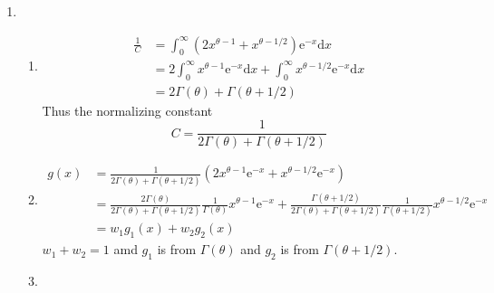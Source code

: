 \documentclass{article}
\begin{document}
\begin{enumerate}[leftmargin = 0 em, label = \arabic*., font = \bfseries]
	

	\item 
	\begin{enumerate}
		\item 
		\begin{align*}
		\frac{1}{C} &= \int_{0}^{\infty} (2 x ^{\theta - 1} + x^{\theta - 1/2}) \mathrm{e}^{-x} \mathrm{d}x\\
		& = 2 \int_{0}^{\infty} x^{\theta - 1} \mathrm{e}^{-x} \mathrm{d}x + \int_{0}^{\infty} x^{\theta - 1/2} \mathrm{e}^{-x} \mathrm{d}x\\
		& = 2 \Gamma(\theta) + \Gamma(\theta + 1/2) 
		\end{align*}
		Thus the normalizing constant 
		\[C = \frac{1}{2 \Gamma(\theta) + \Gamma(\theta + 1/2)}\]

		\item 
		\begin{align*}
		g(x) & = \frac{1}{2 \Gamma (\theta) + \Gamma(\theta + 1/2)} \left(2 x^{\theta - 1}  \mathrm{e}^{-x} + x^{\theta - 1/2} \mathrm{e}^{-x}\right)\\
		& = \frac{2 \Gamma (\theta)}{ 2 \Gamma (\theta)	+ \Gamma(\theta + 1/2)} \frac{1}{\Gamma(\theta)}x^{\theta - 1} \mathrm{e}^{-x} + \frac{\Gamma(\theta + 1/2)}{2 \Gamma(\theta) + \Gamma(\theta + 1/2)} \frac{1}{\Gamma(\theta + 1/2)}x^{\theta - 1/2} \mathrm{e}^{-x}\\
		& = w_1 g_1 (x) + w_2 g_2(x)
		\end{align*}
		$w_1 + w_2 = 1$ amd $g_1$ is from $\Gamma(\theta)$ and $g_2$ is from $\Gamma(\theta + 1/2)$.
		\item 


\end{enumerate}
\end{enumerate}
\end{document}
